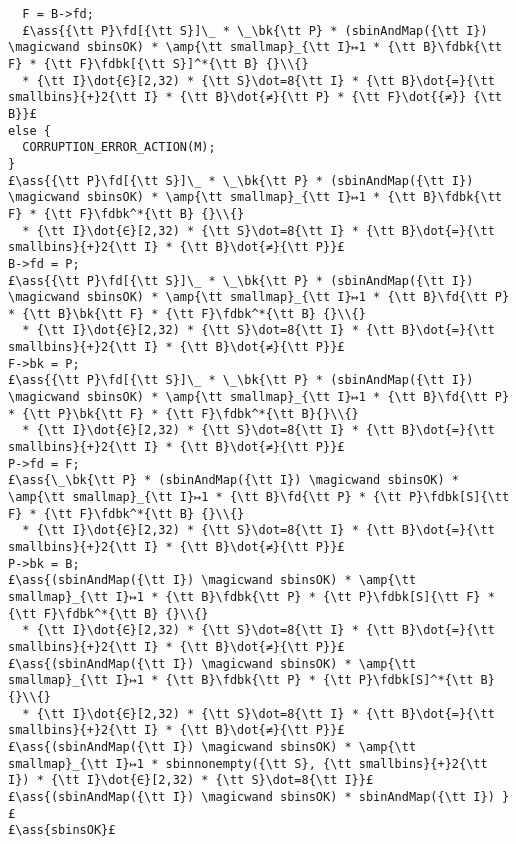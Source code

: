 \documentclass[10pt,a4paper,twoside]{report}
\makeatletter
\newcommand{\ml}[2][t]{\mbox{\mdseries\begin{tabular}[#1]{@{}L@{}}#2\end{tabular}}}
\newcommand{\ass}[1]{\ensuremath{{\color{blue}\left\{\ml[c]{#1}\right\}}}}
\makeatother
\begin{document}
\begin{lstlisting}
  F = B->fd;
  £\ass{{\tt P}\fd[{\tt S}]\_ * \_\bk{\tt P} * (sbinAndMap({\tt I}) \magicwand sbinsOK) * \amp{\tt smallmap}_{\tt I}↦1 * {\tt B}\fdbk{\tt F} * {\tt F}\fdbk[{\tt S}]^*{\tt B} {}\\{} 
  * {\tt I}\dot{∈}[2,32) * {\tt S}\dot=8{\tt I} * {\tt B}\dot{=}{\tt smallbins}{+}2{\tt I} * {\tt B}\dot{≠}{\tt P} * {\tt F}\dot{{≠}} {\tt B}}£
else {
  CORRUPTION_ERROR_ACTION(M);
}
£\ass{{\tt P}\fd[{\tt S}]\_ * \_\bk{\tt P} * (sbinAndMap({\tt I}) \magicwand sbinsOK) * \amp{\tt smallmap}_{\tt I}↦1 * {\tt B}\fdbk{\tt F} * {\tt F}\fdbk^*{\tt B} {}\\{} 
  * {\tt I}\dot{∈}[2,32) * {\tt S}\dot=8{\tt I} * {\tt B}\dot{=}{\tt smallbins}{+}2{\tt I} * {\tt B}\dot{≠}{\tt P}}£
B->fd = P;
£\ass{{\tt P}\fd[{\tt S}]\_ * \_\bk{\tt P} * (sbinAndMap({\tt I}) \magicwand sbinsOK) * \amp{\tt smallmap}_{\tt I}↦1 * {\tt B}\fd{\tt P} * {\tt B}\bk{\tt F} * {\tt F}\fdbk^*{\tt B} {}\\{} 
  * {\tt I}\dot{∈}[2,32) * {\tt S}\dot=8{\tt I} * {\tt B}\dot{=}{\tt smallbins}{+}2{\tt I} * {\tt B}\dot{≠}{\tt P}}£
F->bk = P;
£\ass{{\tt P}\fd[{\tt S}]\_ * \_\bk{\tt P} * (sbinAndMap({\tt I}) \magicwand sbinsOK) * \amp{\tt smallmap}_{\tt I}↦1 * {\tt B}\fd{\tt P} * {\tt P}\bk{\tt F} * {\tt F}\fdbk^*{\tt B}{}\\{} 
  * {\tt I}\dot{∈}[2,32) * {\tt S}\dot=8{\tt I} * {\tt B}\dot{=}{\tt smallbins}{+}2{\tt I} * {\tt B}\dot{≠}{\tt P}}£
P->fd = F;
£\ass{\_\bk{\tt P} * (sbinAndMap({\tt I}) \magicwand sbinsOK) * \amp{\tt smallmap}_{\tt I}↦1 * {\tt B}\fd{\tt P} * {\tt P}\fdbk[S]{\tt F} * {\tt F}\fdbk^*{\tt B} {}\\{} 
  * {\tt I}\dot{∈}[2,32) * {\tt S}\dot=8{\tt I} * {\tt B}\dot{=}{\tt smallbins}{+}2{\tt I} * {\tt B}\dot{≠}{\tt P}}£
P->bk = B;
£\ass{(sbinAndMap({\tt I}) \magicwand sbinsOK) * \amp{\tt smallmap}_{\tt I}↦1 * {\tt B}\fdbk{\tt P} * {\tt P}\fdbk[S]{\tt F} * {\tt F}\fdbk^*{\tt B} {}\\{} 
  * {\tt I}\dot{∈}[2,32) * {\tt S}\dot=8{\tt I} * {\tt B}\dot{=}{\tt smallbins}{+}2{\tt I} * {\tt B}\dot{≠}{\tt P}}£
£\ass{(sbinAndMap({\tt I}) \magicwand sbinsOK) * \amp{\tt smallmap}_{\tt I}↦1 * {\tt B}\fdbk{\tt P} * {\tt P}\fdbk[S]^*{\tt B} {}\\{} 
  * {\tt I}\dot{∈}[2,32) * {\tt S}\dot=8{\tt I} * {\tt B}\dot{=}{\tt smallbins}{+}2{\tt I} * {\tt B}\dot{≠}{\tt P}}£
£\ass{(sbinAndMap({\tt I}) \magicwand sbinsOK) * \amp{\tt smallmap}_{\tt I}↦1 * sbinnonempty({\tt S}, {\tt smallbins}{+}2{\tt I}) * {\tt I}\dot{∈}[2,32) * {\tt S}\dot=8{\tt I}}£
£\ass{(sbinAndMap({\tt I}) \magicwand sbinsOK) * sbinAndMap({\tt I}) }£
£\ass{sbinsOK}£
\end{lstlisting}
\end{document}
